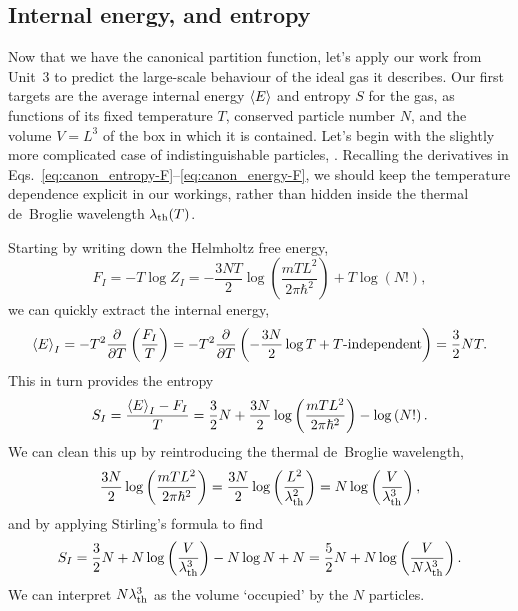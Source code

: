 \subsection{Internal energy, and entropy}
Now that we have the canonical partition function, let's apply our work from Unit~3 to predict the large-scale behaviour of the ideal gas it describes.
Our first targets are the average internal energy $\left\langle E \right\rangle$ and entropy $S$ for the gas, as functions of its fixed temperature $T$, conserved particle number $N$, and the volume $V = L^3$ of the box in which it is contained.
Let's begin with the slightly more complicated case of indistinguishable particles, .
Recalling the derivatives in Eqs.~\ref{eq:canon_entropy-F}--\ref{eq:canon_energy-F}, we should keep the temperature dependence explicit in our workings, rather than hidden inside the thermal de~Broglie wavelength $\lambda_{\mathrm{th}}(T)$.

Starting by writing down the Helmholtz free energy,
\begin{equation*}
  F_I = -T \log Z_I = -\frac{3NT}{2}\log\left(\frac{mTL^2}{2\pi\hbar^2}\right) + T \log\left(N!\right),
\end{equation*}
we can quickly extract the internal energy,
\begin{equation*}
  \left\langle E \right\rangle_I = -T^2 \frac{\partial }{\partial T}\left(\frac{F_I}{T}\right) = -T^2 \frac{\partial }{\partial T}\left(-\frac{3N}{2}\log T + T\mbox{-independent}\right) = \frac{3}{2} NT.
\end{equation*}
This in turn provides the entropy
\begin{equation*}
  S_I = \frac{\left\langle E \right\rangle_I - F_I}{T} = \frac{3}{2} N + \frac{3N}{2}\log\left(\frac{mTL^2}{2\pi\hbar^2}\right) - \log\left(N!\right).
\end{equation*}
We can clean this up by reintroducing the thermal de~Broglie wavelength,
\begin{equation*}
  \frac{3N}{2}\log\left(\frac{mTL^2}{2\pi\hbar^2}\right) = \frac{3N}{2}\log\left(\frac{L^2}{\lambda_{\mathrm{th}}^2}\right) = N\log\left(\frac{V}{\lambda_{\mathrm{th}}^3}\right),
\end{equation*}
and by applying Stirling's formula to find
\begin{equation*}
  S_I = \frac{3}{2} N + N\log\left(\frac{V}{\lambda_{\mathrm{th}}^3}\right) - N\log N + N = \frac{5}{2} N + N\log\left(\frac{V}{N\lambda_{\mathrm{th}}^3}\right).
\end{equation*}
We can interpret $N\lambda_{\mathrm{th}}^3$ as the volume `occupied' by the $N$ particles. %

